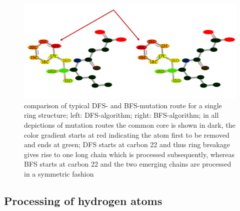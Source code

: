 \begin{figure}
\includegraphics[scale=0.4]{simple_ring_exampledfs.png}

\caption{comparison of typical DFS- and BFS-mutation route for a single ring structure; left: DFS-algorithm; right: BFS-algorithm; in all depictions of mutation routes the common core is shown in dark, the color gradient starts at red indicating the atom first to be removed and ends at green; DFS
starts at carbon 22 and thus ring breakage gives rise to one long
chain which is processed subsequently, whereas BFS starts at carbon
22 and the two emerging chains are processed in a symmetric fashion
}

\end{figure}


\subsection{Processing of hydrogen atoms}


